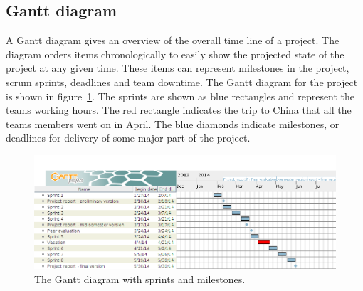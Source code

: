 \subsection{Gantt diagram}
\label{sec:gantt}

A Gantt diagram gives an overview of the overall time line of a project. The diagram orders items chronologically to easily show the projected state of the project at any given time. These items can represent milestones in the project, scrum sprints, deadlines and team downtime. 
The Gantt diagram for the project is shown in figure~\ref{fig:gantt}. The sprints are shown as blue rectangles and represent the teams working hours. The red rectangle indicates the trip to China that all the teams members went on in April. The blue diamonds indicate milestones, or deadlines for delivery of some major part of the project.


\begin{figure}[H]
\includegraphics[width=\textwidth]{ch/prestudy/fig/gantt.png}
\caption{The Gantt diagram with sprints and milestones.}
\label{fig:gantt}
\end{figure}
